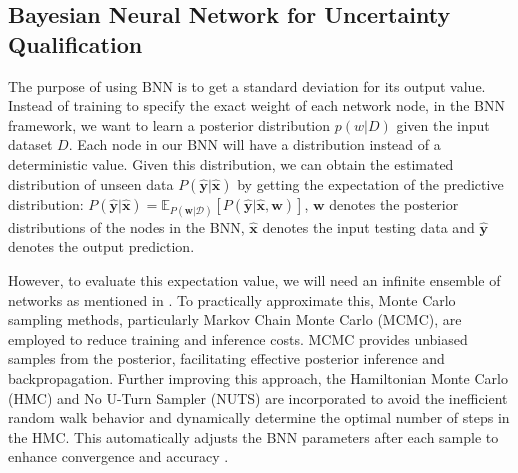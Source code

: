 \subsection{Bayesian Neural Network for Uncertainty Qualification}



The purpose of using BNN is to get a standard deviation for its output value. Instead of training to specify the exact weight of each network node, in the BNN framework, 
we want to learn a posterior distribution $p(w|D)$ given the input dataset $D$. Each node in our BNN will have a distribution instead of a deterministic value. Given this distribution, we can obtain the estimated distribution of unseen data     $P(\hat{\mathbf{y}}|\hat{\mathbf{x}})$ by getting the expectation of the predictive distribution: $P(\hat{\mathbf{y}}|\hat{\mathbf{x}}) = \mathbb{E}_{P(\mathbf{w}|\mathcal{D})}[P(\hat{\mathbf{y}}|\hat{\mathbf{x}},\mathbf{w})]$, $\mathbf{w}$ denotes the posterior distributions of the nodes in the BNN, $\hat{\mathbf{x}}$ denotes the input testing data and $\hat{\mathbf{y}}$ denotes the output prediction.

However, to evaluate this expectation value, we will need an infinite ensemble of networks as mentioned in \cite{weightuncertainty}. To practically approximate this, Monte Carlo sampling methods, particularly Markov Chain Monte Carlo (MCMC), are employed to reduce training and inference costs. MCMC provides unbiased samples from the posterior, facilitating effective posterior inference and backpropagation.  
Further improving this approach, the Hamiltonian Monte Carlo (HMC) and No U-Turn Sampler (NUTS) are incorporated to avoid the inefficient random walk behavior and dynamically determine the optimal number of steps in the HMC. This automatically adjusts the BNN parameters after each sample to enhance convergence and accuracy \cite{hoffman2011nouturnsampleradaptivelysetting} \cite{Brooks_2011}. 

